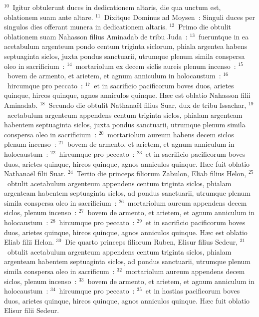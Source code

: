 ${}^{10}$~Igitur obtulerunt duces in dedicationem altaris, die qua unctum est, oblationem suam ante altare.
${}^{11}$~Dixitque Dominus ad Moysen~: Singuli duces per singulos dies offerant munera in dedicationem altaris.
${}^{12}$~Primo die obtulit oblationem suam Nahasson filius Aminadab de tribu Juda~:
${}^{13}$~fueruntque in ea acetabulum argenteum pondo centum triginta siclorum, phiala argentea habens septuaginta siclos, juxta pondus sanctuarii, utrumque plenum simila conspersa oleo in sacrificium~:
${}^{14}$~mortariolum ex decem siclis aureis plenum incenso~:
${}^{15}$~bovem de armento, et arietem, et agnum anniculum in holocaustum~:
${}^{16}$~hircumque pro peccato~:
${}^{17}$~et in sacrificio pacificorum boves duos, arietes quinque, hircos quinque, agnos anniculos quinque. H\ae c est oblatio Nahasson filii Aminadab.
${}^{18}$~Secundo die obtulit Nathana\"el filius Suar, dux de tribu Issachar,
${}^{19}$~acetabulum argenteum appendens centum triginta siclos, phialam argenteam habentem septuaginta siclos, juxta pondus sanctuarii, utrumque plenum simila conspersa oleo in sacrificium~:
${}^{20}$~mortariolum aureum habens decem siclos plenum incenso~:
${}^{21}$~bovem de armento, et arietem, et agnum anniculum in holocaustum~:
${}^{22}$~hircumque pro peccato~:
${}^{23}$~et in sacrificio pacificorum boves duos, arietes quinque, hircos quinque, agnos anniculos quinque. H\ae c fuit oblatio Nathana\"el filii Suar.
${}^{24}$~Tertio die princeps filiorum Zabulon, Eliab filius Helon,
${}^{25}$~obtulit acetabulum argenteum appendens centum triginta siclos, phialam argenteam habentem septuaginta siclos, ad pondus sanctuarii, utrumque plenum simila conspersa oleo in sacrificium~:
${}^{26}$~mortariolum aureum appendens decem siclos, plenum incenso~:
${}^{27}$~bovem de armento, et arietem, et agnum anniculum in holocaustum~:
${}^{28}$~hircumque pro peccato~:
${}^{29}$~et in sacrificio pacificorum boves duos, arietes quinque, hircos quinque, agnos anniculos quinque. H\ae c est oblatio Eliab filii Helon.
${}^{30}$~Die quarto princeps filiorum Ruben, Elisur filius Sedeur,
${}^{31}$~obtulit acetabulum argenteum appendens centum triginta siclos, phialam argenteam habentem septuaginta siclos, ad pondus sanctuarii, utrumque plenum simila conspersa oleo in sacrificum~:
${}^{32}$~mortariolum aureum appendens decem siclos, plenum incenso~:
${}^{33}$~bovem de armento, et arietem, et agnum anniculum in holocaustum~:
${}^{34}$~hircumque pro peccato~:
${}^{35}$~et in hostias pacificorum boves duos, arietes quinque, hircos quinque, agnos anniculos quinque. H\ae c fuit oblatio Elisur filii Sedeur.
